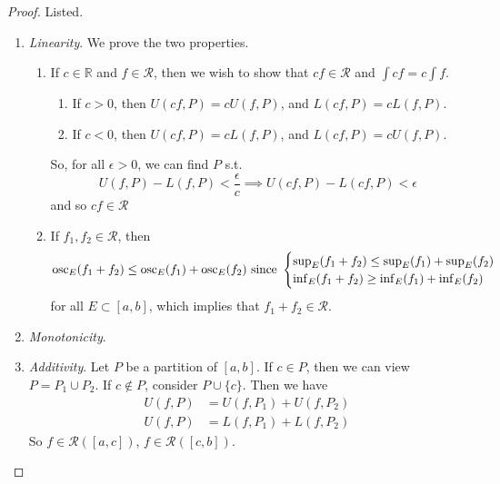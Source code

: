   \begin{proof}
    Listed. 
    \begin{enumerate}
      \item \textit{Linearity}. We prove the two properties. 
        \begin{enumerate}
          \item If $c \in \mathbb{R}$ and $f \in \mathcal{R}$, then we wish to show that $cf \in \mathcal{R}$ and $\int c f = c \int f$. 
            \begin{enumerate}
              \item If $c > 0$, then $U(cf, P) = c U(f, P)$, and $L(cf, P) = c L(f, P)$. 
              \item If $c < 0$, then $U(cf, P) = c L(f, P)$, and $L(cf, P) = c U(f, P)$. 
            \end{enumerate} 
            So, for all $\epsilon > 0$, we can find $P$ s.t. 
            \begin{equation}
              U(f, P) - L(f, P) < \frac{\epsilon}{c} \implies U(cf, P) - L(cf, P) < \epsilon
            \end{equation} 
            and so $cf \in \mathcal{R}$  

          \item If $f_1, f_2 \in \mathcal{R}$, then 
            \begin{equation}
              \operatorname{osc}_E (f_1 + f_2) \leq \operatorname{osc}_E (f_1) + \operatorname{osc}_E (f_2) \text{ since } \begin{cases} 
                \sup_E (f_1 + f_2) \leq \sup_E (f_1) + \sup_E (f_2) \\
                \inf_E (f_1 + f_2) \geq \inf_E (f_1) + \inf_E (f_2)
              \end{cases}
            \end{equation} 
            for all $E \subset [a, b]$, which implies that $f_1 + f_2 \in \mathcal{R}$. 
        \end{enumerate}

      \item \textit{Monotonicity}. 

      \item \textit{Additivity}. Let $P$ be a partition of $[a, b]$. If $c \in P$, then we can view $P = P_1 \cup P_2$. If $c \not\in P$, consider $P \cup \{c\}$. Then we have 
        \begin{align}
          U(f, P) & = U(f, P_1) + U(f, P_2) \\ 
          U(f, P) & = L(f, P_1) + L(f, P_2) 
        \end{align}
        So $f \in \mathcal{R}([a, c])$, $f \in \mathcal{R}([c, b])$. 
    \end{enumerate}
  \end{proof}
